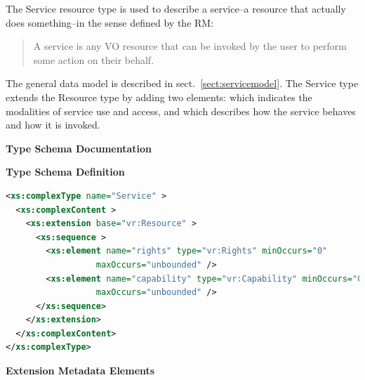 \documentclass[11pt,a4paper]{ivoa}
\begin{document}
The Service resource type is used to describe a service--a resource
that actually does something--in the sense defined by the
RM:

\begin{quotation}
A service is any VO resource that can be invoked by the user to
perform some action on their behalf.  
\end{quotation}


The general data model is described in sect.~\ref{sect:servicemodel}.
The Service type extends the Resource type by adding two elements:
 which indicates the modalities of service use and access, and
 which describes how the service behaves and how it is
invoked.


\begingroup
      	\renewcommand*\descriptionlabel[1]{%
      	\hbox to 5.5em{\emph{#1}\hfil}}\vspace{2ex}\noindent\textbf{ Type Schema Documentation}


\vspace{1ex}\noindent\textbf{ Type Schema Definition}

\begin{lstlisting}[language=XML,basicstyle=\footnotesize]
<xs:complexType name="Service" >
  <xs:complexContent >
    <xs:extension base="vr:Resource" >
      <xs:sequence >
        <xs:element name="rights" type="vr:Rights" minOccurs="0"
                  maxOccurs="unbounded" />
        <xs:element name="capability" type="vr:Capability" minOccurs="0"
                  maxOccurs="unbounded" />
      </xs:sequence>
    </xs:extension>
  </xs:complexContent>
</xs:complexType>
\end{lstlisting}

\vspace{0.5ex}\noindent\textbf{ Extension Metadata Elements}
\end{document}
